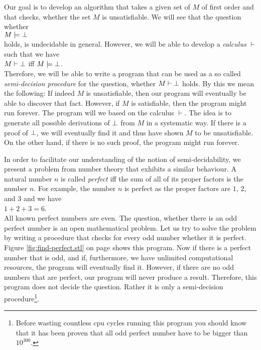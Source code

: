 \noindent
Our goal is to develop an algorithm that takes a given set of $M$ of first order \formulae and that
checks, whether the set $M$ is unsatisfiable.  We will see that the question
whether 
\\[0.2cm]
\hspace*{1.3cm}
 $M \models \bot$
\\[0.2cm]
holds, is undecidable in general.  However, we will be able to develop a \emph{calculus}
 $\vdash$ such that we have \\[0.2cm]
\hspace*{1.3cm} 
$M \vdash \bot$ \quad iff \quad $M \models \bot$. 
\\[0.2cm]
Therefore, we will be able to write a program that can be used as a so called \emph{semi-decision procedure} 
for the question, whether $M \vdash \bot$ holds.  By this we mean the following:  If indeed 
$M$ is unsatisfiable, then our program will eventually be able to discover that fact.  However, if
$M$ is satisfiable, then the program might run forever. The program will we based on the calculus
$\vdash$.  The idea is to generate all possible derivations of $\bot$ from $M$ in a systematic
way.  If there is a proof of $\bot$, we will eventually find it and thus have shown $M$ to be
unsatisfiable.  On the other hand, if there is no such proof, the program might run forever.


In order to facilitate our understanding of the notion of semi-decidability, we present a problem from number theory that
exhibits a similar behaviour.  A natural number $n$ is called  \emph{perfect} iff the sum of all of
its proper factors is the number $n$.  For example, the number $n$ is perfect as the proper factors
are $1$, $2$, and $3$ and we have
\\[0.2cm]
\hspace*{1.3cm}
$1 + 2 + 3 = 6$.
\\[0.2cm]
All known perfect numbers are even.  The question, whether there is an odd perfect number is an open
mathematical problem.
Let us try to solve the problem by writing a procedure that checks for every odd number whether it
is perfect.  Figure  \ref{fig:find-perfect.stl} on page \pageref{fig:find-perfect.stl} shows this
program.  Now if there is a perfect number that is odd, and if, furthermore, we have unlimited
computational resources, the program will eventually find it.
However, if there are no odd numbers that are perfect,  our program will never produce a result.
Therefore, this program does not decide the question.  Rather it is only a semi-decision 
procedure\footnote{Before wasting countless cpu cycles running this program you should know that it
  has been proven that all odd perfect number have to be bigger than $10^{300}$.}.


